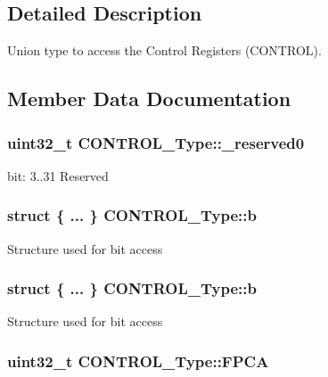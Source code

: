 \subsection{Detailed Description}
Union type to access the Control Registers (C\-O\-N\-T\-R\-O\-L). 

\subsection{Member Data Documentation}
\hypertarget{union_c_o_n_t_r_o_l___type_af8c314273a1e4970a5671bd7f8184f50}{
\subsubsection[{\-\_\-reserved0}]{\setlength{\rightskip}{0pt plus 5cm}uint32\-\_\-t C\-O\-N\-T\-R\-O\-L\-\_\-\-Type\-::\-\_\-reserved0}}\label{union_c_o_n_t_r_o_l___type_af8c314273a1e4970a5671bd7f8184f50}
bit\-: 3..31 Reserved \hypertarget{union_c_o_n_t_r_o_l___type_a383e052776cf878e9b02f5d3a520bef7}{
\subsubsection[{b}]{\setlength{\rightskip}{0pt plus 5cm}struct \{ ... \}   C\-O\-N\-T\-R\-O\-L\-\_\-\-Type\-::b}}\label{union_c_o_n_t_r_o_l___type_a383e052776cf878e9b02f5d3a520bef7}
Structure used for bit access \hypertarget{union_c_o_n_t_r_o_l___type_aa62abc89b024d8037a1b1ffe596b0d2b}{
\subsubsection[{b}]{\setlength{\rightskip}{0pt plus 5cm}struct \{ ... \}   C\-O\-N\-T\-R\-O\-L\-\_\-\-Type\-::b}}\label{union_c_o_n_t_r_o_l___type_aa62abc89b024d8037a1b1ffe596b0d2b}
Structure used for bit access \hypertarget{union_c_o_n_t_r_o_l___type_ac62cfff08e6f055e0101785bad7094cd}{
\subsubsection[{F\-P\-C\-A}]{\setlength{\rightskip}{0pt plus 5cm}uint32\-\_\-t C\-O\-N\-T\-R\-O\-L\-\_\-\-Type\-::\-F\-P\-C\-A}}\label{union_c_o_n_t_r_o_l___type_ac62cfff08e6f055e0101785bad7094cd}
